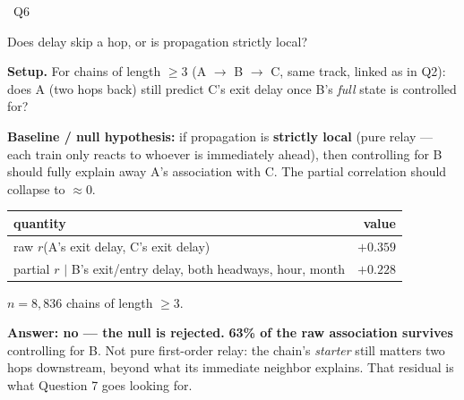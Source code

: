 \documentclass[aspectratio=169,10pt]{beamer}
\newcommand{\srcnote}[1]{{\scriptsize\color{ink3}#1}}
\newcommand{\hl}[1]{{\color{corange}\textbf{#1}}}
\newcommand{\qtag}[1]{{\scriptsize\color{surface}\colorbox{cblue}{\strut~Q#1~}}}
\begin{document}
\begin{frame}{\qtag{6} Does delay skip a hop, or is propagation strictly local?}
  \textbf{Setup.} For chains of length $\geq$3 (A $\to$ B $\to$ C, same track,
  linked as in Q2): does A (two hops back) still predict C's exit delay once B's
  \emph{full} state is controlled for?

  \vspace{0.4em}
  \textbf{Baseline / null hypothesis:} if propagation is \textbf{strictly local}
  (pure relay --- each train only reacts to whoever is immediately ahead), then
  controlling for B should fully explain away A's association with C. The
  partial correlation should collapse to $\approx$0.

  \vspace{0.6em}
  \centering
  \begin{tabular}{@{}lr@{}}
    \toprule
    quantity & value \\
    \midrule
    raw $r$(A's exit delay, C's exit delay) & $+0.359$ \\
    partial $r$ $\mid$ B's exit/entry delay, both headways, hour, month & $+0.228$ \\
    \bottomrule
  \end{tabular}

  \vspace{0.3em}
  \srcnote{$n=8{,}836$ chains of length $\geq$3.}

  \vspace{0.4em}
  \textbf{Answer: no --- the null is rejected.} \hl{63\% of the raw association
  survives} controlling for B. Not pure first-order relay: the chain's
  \emph{starter} still matters two hops downstream, beyond what its immediate
  neighbor explains. That residual is what Question 7 goes looking for.
\end{frame}
\end{document}
